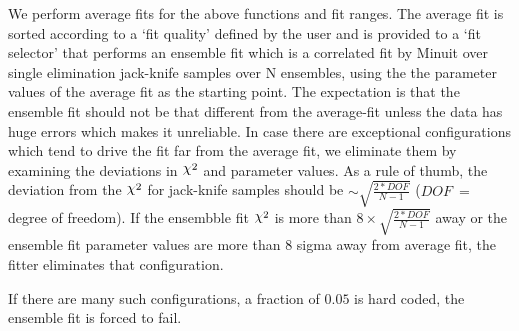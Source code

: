 \documentclass[10pt]{article}
\DeclareRobustCommand{\rchi}{{\mathpalette\irchi\relax}}
\newcommand{\irchi}[2]{\raisebox{\depth}{$#1\chi$}} %
\begin{document}
We perform average fits for the above functions and fit ranges. The average fit is sorted according to a `fit quality' defined by the user and is provided to a `fit selector' that performs an ensemble fit which is a correlated fit by Minuit over single elimination jack-knife samples over N ensembles, using the the parameter values of the average fit as the starting point. The expectation is that the ensemble fit should not be that different from the average-fit unless the data has huge errors which makes it unreliable. In case there are exceptional configurations which tend to drive the fit far from the average fit, we eliminate them by examining  the deviations in $\rchi^2$ and parameter values. As a rule of thumb, the deviation from the $\rchi^2$ for jack-knife samples should be $\sim  \sqrt{\frac{2*DOF}{N-1}}$ ($DOF\ =$ degree of freedom). If the ensembble fit $\rchi^2$  is more than $ 8 \times \sqrt{\frac{2*DOF}{N-1}}$ away or the ensemble fit parameter values are more than 8 sigma away from average fit, the fitter eliminates that configuration.  

If there are many such configurations, a fraction of $0.05$ is hard coded, the ensemble fit is forced to fail. \par
\end{document}
